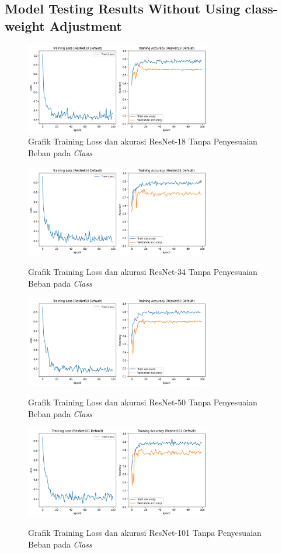 \subsection{Model Testing Results Without Using class-weight Adjustment}
\begin{figure}[hbtp]
	\centering
	\includegraphics[height=4cm]{gambar/TrainingGraphResNet18.png}
	\caption{Grafik Training Loss dan akurasi ResNet-18 Tanpa Penyesuaian Beban pada \emph{Class}}
	\label{Fig:GraphTrainingDefPt1}
\end{figure}
\begin{figure}[hbtp]
	{\includegraphics[height=4cm]{gambar/TrainingGraphResNet34.png}}
	\caption{Grafik Training Loss dan akurasi ResNet-34 Tanpa Penyesuaian Beban pada \emph{Class}}
	\label{Fig:GraphTrainingDefPt2}
\end{figure}
\begin{figure}[hbtp]
	\centering
	{\includegraphics[height=4cm]{gambar/TrainingGraphResNet50.png}}
	\caption{Grafik Training Loss dan akurasi ResNet-50 Tanpa Penyesuaian Beban pada \emph{Class}}
	\label{Fig:GraphTrainingDefPt3}
\end{figure}
\begin{figure}[hbtp]
	{\includegraphics[height=4cm]{gambar/TrainingGraphResNet101.png}}
	\caption{Grafik Training Loss dan akurasi ResNet-101 Tanpa Penyesuaian Beban pada \emph{Class}}
	\label{Fig:GraphTrainingDefPt4}
\end{figure}
